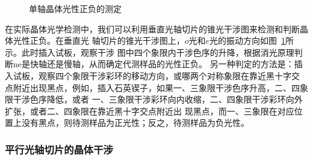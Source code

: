 \documentclass[11pt,a4paper]{article}
\begin{document}
\begin{spacing}{1.3}
\begin{CJK*}{UTF8}{gbsn}
\begin{figure}
\caption{单轴晶体光性正负的测定}
\label{fig:4-1-9}
\end{figure}
在实际晶体光学检测中，我们可以利用垂直光轴切片的锥光干涉图来检测和判断晶体光性正负。在垂直光
轴切片的锥光干涉图上，$o$光和$e$光的振动方向如图~\ref{fig:4-1-9}所示。此时插入试板，观察干涉
图中四个象限内干涉色序的升降，根据消光原理判断ne是快轴还是慢轴，从而确定代测样品的光性正负。
另一种判定的方法是：插入试板，观察四个象限干涉彩环的移动方向，或哪两个对称象限在靠近黑十字交
点附近出现黑点，例如，插入石英锲子，如果一、三象限干涉色序升高，二、四象限干涉色序降低，或者
一、三象限干涉彩环向内收缩，二、四象限干涉彩环向外扩张，或者二、四象限在靠近黑十字交点附近出
现黑点，而一、三象限在对应位置上没有黑点，则待测样品为正光性；反之，待测样品为负光性。
\subsubsection{平行光轴切片的晶体干涉}


\end{CJK*}
\end{spacing}
\end{document}
